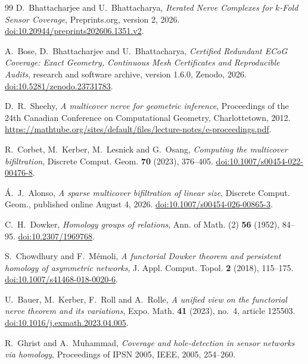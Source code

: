 \begin{thebibliography}{99}
D.~Bhattacharjee and U.~Bhattacharya,
\emph{Iterated Nerve Complexes for $k$-Fold Sensor Coverage},
Preprints.org, version 2, 2026.
\href{https://doi.org/10.20944/preprints202606.1351.v2}{doi:10.20944/preprints202606.1351.v2}.

A.~Bose, D.~Bhattacharjee and U.~Bhattacharya,
\emph{Certified Redundant ECoG Coverage: Exact Geometry, Continuous Mesh Certificates and Reproducible Audits},
research and software archive, version 1.6.0, Zenodo, 2026.
\href{https://doi.org/10.5281/zenodo.23731783}{doi:10.5281/zenodo.23731783}.

D.~R.~Sheehy,
\emph{A multicover nerve for geometric inference},
Proceedings of the 24th Canadian Conference on Computational Geometry, Charlottetown, 2012.
\url{https://mathtube.org/sites/default/files/lecture-notes/e-proceedings.pdf}.

R.~Corbet, M.~Kerber, M.~Lesnick and G.~Osang,
\emph{Computing the multicover bifiltration},
Discrete Comput. Geom. \textbf{70} (2023), 376--405.
\href{https://doi.org/10.1007/s00454-022-00476-8}{doi:10.1007/s00454-022-00476-8}.

\'{A}.~J.~Alonso,
\emph{A sparse multicover bifiltration of linear size},
Discrete Comput. Geom., published online August 4, 2026.
\href{https://doi.org/10.1007/s00454-026-00865-3}{doi:10.1007/s00454-026-00865-3}.

C.~H.~Dowker,
\emph{Homology groups of relations},
Ann. of Math. (2) \textbf{56} (1952), 84--95.
\href{https://doi.org/10.2307/1969768}{doi:10.2307/1969768}.

S.~Chowdhury and F.~M\'emoli,
\emph{A functorial Dowker theorem and persistent homology of asymmetric networks},
J. Appl. Comput. Topol. \textbf{2} (2018), 115--175.
\href{https://doi.org/10.1007/s41468-018-0020-6}{doi:10.1007/s41468-018-0020-6}.

U.~Bauer, M.~Kerber, F.~Roll and A.~Rolle,
\emph{A unified view on the functorial nerve theorem and its variations},
Expo. Math. \textbf{41} (2023), no.~4, article 125503.
\href{https://doi.org/10.1016/j.exmath.2023.04.005}{doi:10.1016/j.exmath.2023.04.005}.

R.~Ghrist and A.~Muhammad,
\emph{Coverage and hole-detection in sensor networks via homology},
Proceedings of IPSN 2005, IEEE, 2005, 254--260.


\end{thebibliography}
